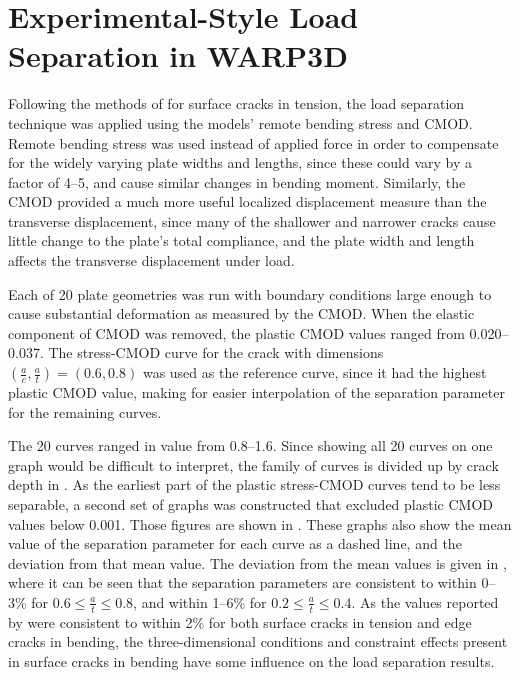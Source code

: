 \chapter{Experimental-Style Load Separation in WARP3D} \label{chap:load-separation-experimental}


Following the methods of \cite{sharobeamlandes1994} for surface cracks in tension, the load separation technique was applied using the models' remote bending stress and CMOD.
Remote bending stress was used instead of applied force in order to compensate for the widely varying plate widths and lengths, since these could vary by a factor of 4--5, and cause similar changes in bending moment.
Similarly, the CMOD provided a much more useful localized displacement measure than the transverse displacement, since many of the shallower and narrower cracks cause little change to the plate's total compliance, and the plate width and length affects the transverse displacement under load.

Each of 20 plate geometries was run with boundary conditions large enough to cause substantial deformation as measured by the CMOD.
When the elastic component of CMOD was removed, the plastic CMOD values ranged from 0.020--0.037.
The stress-CMOD curve for the crack with dimensions \((\frac{a}{c}, \frac{a}{t})=(0.6, 0.8)\) was used as the reference curve, since it had the highest plastic CMOD value, making for easier interpolation of the \Sij separation parameter for the remaining curves.

The 20 \Sij curves ranged in value from 0.8--1.6. Since showing all 20 curves on one graph would be difficult to interpret, the family of curves is divided up by crack depth in .
As the earliest part of the plastic stress-CMOD curves tend to be less separable, a second set of graphs was constructed that excluded plastic CMOD values below 0.001.
Those figures are shown in .
These graphs also show the mean value of the separation parameter \Sij for each curve as a dashed line, and the deviation from that mean value.
The deviation from the mean \Sij values is given in , where it can be seen that the separation parameters are consistent to within 0--3\% for \(0.6 \leq \frac{a}{t} \leq 0.8\), and within 1--6\% for \(0.2 \leq \frac{a}{t} \leq 0.4\).
As the \Sij values reported by \citeauthor{sharobeamlandes1994} were consistent to within 2\% for both surface cracks in tension and edge cracks in bending, the three-dimensional conditions and constraint effects present in surface cracks in bending have some influence on the load separation results.

